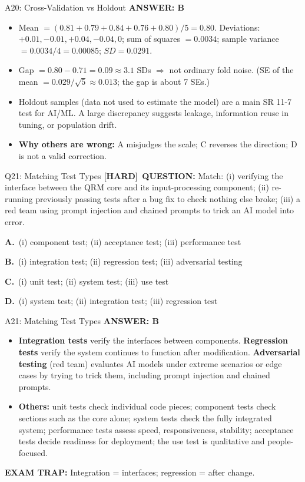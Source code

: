 \documentclass[8pt]{beamer}
\newcommand{\fs}{\fontsize{10}{12}\selectfont}
\newcommand{\opts}[4]{\par\vspace{0.12cm}\noindent\textbf{A.}~#1\par\vspace{0.08cm}\noindent\textbf{B.}~#2\par\vspace{0.08cm}\noindent\textbf{C.}~#3\par\vspace{0.08cm}\noindent\textbf{D.}~#4\par}
\newcommand{\ans}[1]{\textcolor{myblue}{\textbf{ANSWER: #1}}}
\newcommand{\trap}[1]{\textcolor{myred}{\textbf{EXAM TRAP:}} #1}
\newcommand{\hard}{\textcolor{myorange}{\textbf{[HARD]}}}
\begin{document}
\begin{frame}[t]{A20: Cross-Validation vs Holdout}
\fs
\ans{B}
\begin{itemize}
\item Mean $=(0.81+0.79+0.84+0.76+0.80)/5=0.80$. Deviations: $+0.01,-0.01,+0.04,-0.04,0$; sum of squares $=0.0034$; sample variance $=0.0034/4=0.00085$; $SD=\mathbf{0.0291}$.
\item Gap $=0.80-0.71=0.09\approx3.1$ SDs $\Rightarrow$ not ordinary fold noise. (SE of the mean $=0.029/\sqrt5\approx0.013$; the gap is about 7 SEs.)
\item Holdout samples (data not used to estimate the model) are a main SR 11-7 test for AI/ML. A large discrepancy suggests leakage, information reuse in tuning, or population drift.
\item \textbf{Why others are wrong:} A misjudges the scale; C reverses the direction; D is not a valid correction.
\end{itemize}
\end{frame}

\begin{frame}[t]{Q21: Matching Test Types}
\fs
\hard\ \textbf{QUESTION:} Match: (i) verifying the interface between the QRM core and its input-processing component; (ii) re-running previously passing tests after a bug fix to check nothing else broke; (iii) a red team using prompt injection and chained prompts to trick an AI model into error.
\opts{(i) component test; (ii) acceptance test; (iii) performance test}
{(i) integration test; (ii) regression test; (iii) adversarial testing}
{(i) unit test; (ii) system test; (iii) use test}
{(i) system test; (ii) integration test; (iii) regression test}
\end{frame}

\begin{frame}[t]{A21: Matching Test Types}
\fs
\ans{B}
\begin{itemize}
\item \textbf{Integration tests} verify the interfaces between components. \textbf{Regression tests} verify the system continues to function after modification. \textbf{Adversarial testing} (red team) evaluates AI models under extreme scenarios or edge cases by trying to trick them, including prompt injection and chained prompts.
\item \textbf{Others:} unit tests check individual code pieces; component tests check sections such as the core alone; system tests check the fully integrated system; performance tests assess speed, responsiveness, stability; acceptance tests decide readiness for deployment; the use test is qualitative and people-focused.
\end{itemize}
\trap{Integration = \textcolor{myblue}{interfaces}; regression = \textcolor{myblue}{after change}.}
\end{frame}
\end{document}
